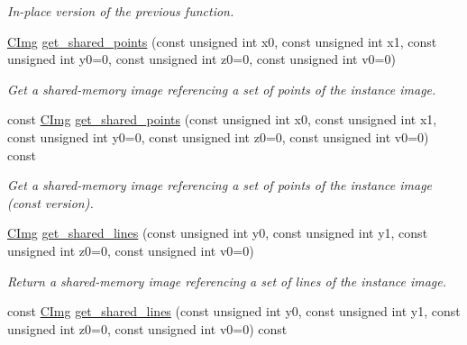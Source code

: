 \begin{DoxyCompactItemize}
\begin{DoxyCompactList}\small\item\em In-\/place version of the previous function. \end{DoxyCompactList}\item 
\hypertarget{structcimg__library_1_1_c_img_a740f8962ff1960b9072a0210d743139c}{\hyperlink{structcimg__library_1_1_c_img}{C\-Img} \hyperlink{structcimg__library_1_1_c_img_a740f8962ff1960b9072a0210d743139c}{get\-\_\-shared\-\_\-points} (const unsigned int x0, const unsigned int x1, const unsigned int y0=0, const unsigned int z0=0, const unsigned int v0=0)}\label{structcimg__library_1_1_c_img_a740f8962ff1960b9072a0210d743139c}

\begin{DoxyCompactList}\small\item\em Get a shared-\/memory image referencing a set of points of the instance image. \end{DoxyCompactList}\item 
\hypertarget{structcimg__library_1_1_c_img_af07ddce901a21e91238f084e7aaa0ee6}{const \hyperlink{structcimg__library_1_1_c_img}{C\-Img} \hyperlink{structcimg__library_1_1_c_img_af07ddce901a21e91238f084e7aaa0ee6}{get\-\_\-shared\-\_\-points} (const unsigned int x0, const unsigned int x1, const unsigned int y0=0, const unsigned int z0=0, const unsigned int v0=0) const }\label{structcimg__library_1_1_c_img_af07ddce901a21e91238f084e7aaa0ee6}

\begin{DoxyCompactList}\small\item\em Get a shared-\/memory image referencing a set of points of the instance image (const version). \end{DoxyCompactList}\item 
\hypertarget{structcimg__library_1_1_c_img_aa1738c002377f0ada89048aae19388d5}{\hyperlink{structcimg__library_1_1_c_img}{C\-Img} \hyperlink{structcimg__library_1_1_c_img_aa1738c002377f0ada89048aae19388d5}{get\-\_\-shared\-\_\-lines} (const unsigned int y0, const unsigned int y1, const unsigned int z0=0, const unsigned int v0=0)}\label{structcimg__library_1_1_c_img_aa1738c002377f0ada89048aae19388d5}

\begin{DoxyCompactList}\small\item\em Return a shared-\/memory image referencing a set of lines of the instance image. \end{DoxyCompactList}\item 
\hypertarget{structcimg__library_1_1_c_img_a012e5781b88a060e5565098898f0358a}{const \hyperlink{structcimg__library_1_1_c_img}{C\-Img} \hyperlink{structcimg__library_1_1_c_img_a012e5781b88a060e5565098898f0358a}{get\-\_\-shared\-\_\-lines} (const unsigned int y0, const unsigned int y1, const unsigned int z0=0, const unsigned int v0=0) const }\label{structcimg__library_1_1_c_img_a012e5781b88a060e5565098898f0358a}


\end{DoxyCompactItemize}
